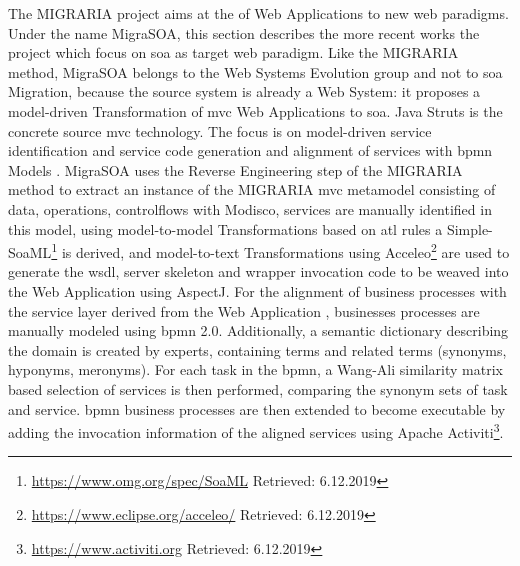 The MIGRARIA project aims at the  of  \glspl{Web Application} to new \gls{web} paradigms.
Under the name MigraSOA, this section describes the more recent works the project \autocite{SosaSanchez2017MigraSOA,Sosa2014MigraSOA,Sosa2013MigraSOA} which focus on \gls{soa} as target \gls{web} paradigm.
Like the MIGRARIA method, MigraSOA belongs to the \gls{Web Systems Evolution} group and not to \gls{soa} Migration, because the \gls{source system} is already a \gls{Web System}: it proposes a model-driven \gls{Transformation} of \gls{mvc} \glspl{Web Application} to \gls{soa}.
Java Struts is the concrete source \gls{mvc} technology.
The focus is on model-driven service identification and service code generation \autocite{Sosa2013MigraSOA} and alignment of services with \gls{bpmn} Models \autocite{Sosa2014MigraSOA}.
MigraSOA uses the \gls{Reverse Engineering} step of the MIGRARIA method to extract an instance of the MIGRARIA \gls{mvc} \gls{metamodel} consisting of data, operations, controlflows with Modisco, services are manually identified in this model, using model-to-model \glspl{Transformation} based on \gls{atl} rules a Simple-SoaML\footnote{\url{https://www.omg.org/spec/SoaML} Retrieved: 6.12.2019} is derived, and model-to-text \glspl{Transformation} using Acceleo\footnote{\url{https://www.eclipse.org/acceleo/} Retrieved: 6.12.2019} are used to generate the \gls{wsdl}, server skeleton and wrapper invocation code to be weaved into the  \gls{Web Application} using AspectJ.
For the alignment of business processes with the service layer derived from the  \gls{Web Application} \autocite{Sosa2014MigraSOA}, businesses processes are manually modeled using \gls{bpmn} 2.0.
Additionally, a semantic dictionary describing the domain is created by experts, containing terms and related terms (synonyms, hyponyms, meronyms).
For each task in the \gls{bpmn}, a Wang-Ali similarity matrix based selection of services is then performed, comparing the synonym sets of task and service.
\gls{bpmn} business processes are then extended to become executable \autocite{SosaSanchez2017MigraSOA} by adding the invocation information of the aligned services using Apache Activiti\footnote{\url{https://www.activiti.org} Retrieved: 6.12.2019}.

